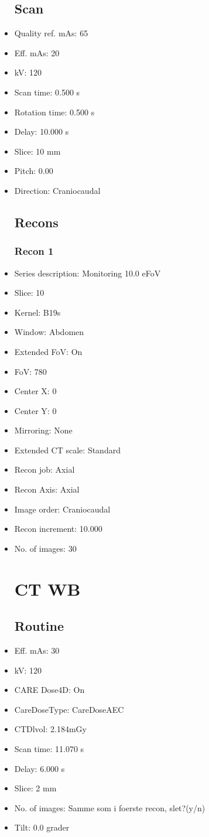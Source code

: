 \documentclass[12pt]{article}
\begin{document}
\begin{itemize}
\subsection{Scan}
\item Quality ref. mAs: 65\item Eff. mAs: 20\item kV: 120\item Scan time: 0.500 s\item Rotation time: 0.500 s\item Delay: 10.000 s\item Slice: 10 mm\item Pitch: 0.00\item Direction: Craniocaudal\subsection{Recons}

\subsubsection{Recon 1}
\item Series description: Monitoring 10.0 eFoV
\item Slice: 10
\item Kernel: B19s
\item Window: Abdomen
\item Extended FoV: On
\item FoV: 780
\item Center X: 0
\item Center Y: 0
\item Mirroring: None
\item Extended CT scale: Standard
\item Recon job: Axial
\item Recon Axis: Axial
\item Image order: Craniocaudal
\item Recon increment: 10.000
\item No. of images: 30
\section{CT WB}
\subsection{Routine}
\item Eff. mAs: 30\item kV: 120\item CARE Dose4D: On\item CareDoseType: CareDoseAEC\item CTDlvol: 2.184mGy\item Scan time: 11.070 s\item Delay: 6.000 s\item Slice: 2 mm\item No. of images: Samme som i foerste recon, slet?(y/n)\item Tilt: 0.0 grader

\end{itemize}
\end{document}
